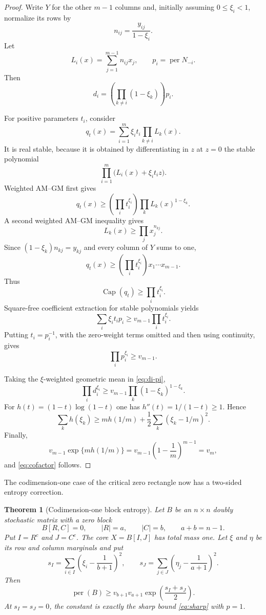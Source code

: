 \documentclass[11pt]{article}
\newtheorem{theorem}{Theorem}[section]
\theoremstyle{definition}
\newcommand{\per}{\operatorname{per}}
\newcommand{\pcap}{\operatorname{Cap}}
\begin{document}
\begin{proof}
Write $Y$ for the other $m-1$ columns and, initially assuming $0\le\xi_i<1$, normalize its rows by
\[
 n_{ij}=\frac{y_{ij}}{1-\xi_i}.
\]
Let
\[
 L_i(x)=\sum_{j=1}^{m-1}n_{ij}x_j,
 \qquad
 p_i=\per N_{-i}.
\]
Then
\[
 d_i=\left(\prod_{k\ne i}(1-\xi_k)\right)p_i.
 \tag{2.2}\label{eq:di-pi}
\]

For positive parameters $t_i$, consider
\[
 q_t(x)=\sum_{i=1}^m\xi_it_i\prod_{k\ne i}L_k(x).
 \tag{2.3}\label{eq:qt}
\]
It is real stable, because it is obtained by differentiating in $z$ at $z=0$ the stable polynomial
\[
 \prod_{i=1}^m\bigl(L_i(x)+\xi_it_i z\bigr).
\]
Weighted AM--GM first gives
\[
 q_t(x)
 \ge
 \left(\prod_i t_i^{\xi_i}\right)
 \prod_k L_k(x)^{1-\xi_k}.
\]
A second weighted AM--GM inequality gives
\[
 L_k(x)\ge\prod_jx_j^{n_{kj}}.
\]
Since $(1-\xi_k)n_{kj}=y_{kj}$ and every column of $Y$ sums to one,
\[
 q_t(x)\ge
 \left(\prod_i t_i^{\xi_i}\right)x_1\cdots x_{m-1}.
\]
Thus
\[
 \pcap(q_t)\ge\prod_i t_i^{\xi_i}.
\]
Square-free coefficient extraction for stable polynomials yields
\[
 \sum_i\xi_i t_i p_i
 \ge v_{m-1}\prod_i t_i^{\xi_i}.
 \tag{2.4}\label{eq:weighted-pi}
\]
Putting $t_i=p_i^{-1}$, with the zero-weight terms omitted and then using continuity, gives
\[
 \prod_i p_i^{\xi_i}\ge v_{m-1}.
 \tag{2.5}\label{eq:pi-gm}
\]

Taking the $\xi$-weighted geometric mean in \eqref{eq:di-pi},
\[
 \prod_i d_i^{\xi_i}
 \ge
 v_{m-1}\prod_k(1-\xi_k)^{1-\xi_k}.
 \tag{2.6}\label{eq:cofactor-intermediate}
\]
For $h(t)=(1-t)\log(1-t)$ one has $h''(t)=1/(1-t)\ge1$.  Hence
\[
 \sum_kh(\xi_k)
 \ge mh(1/m)+\frac12\sum_k(\xi_k-1/m)^2.
\]
Finally,
\[
 v_{m-1}\exp\{mh(1/m)\}=v_{m-1}\left(1-\frac1m\right)^{m-1}=v_m,
\]
and \eqref{eq:cofactor} follows.
\end{proof}

The codimension-one case of the critical zero rectangle now has a two-sided entropy correction.

\begin{theorem}[Codimension-one block entropy]\label{thm:block-entropy}
Let $B$ be an $n\times n$ doubly stochastic matrix with a zero block
\[
 B[R,C]=0,
 \qquad |R|=a,
 \qquad |C|=b,
 \qquad a+b=n-1.
\]
Put $I=R^c$ and $J=C^c$.  The core $X=B[I,J]$ has total mass one.  Let $\xi$ and $\eta$ be its row and column marginals and put
\[
 s_I=\sum_{i\in I}\left(\xi_i-\frac1{b+1}\right)^2,
 \qquad
 s_J=\sum_{j\in J}\left(\eta_j-\frac1{a+1}\right)^2.
\]
Then
\[
 \per(B)\ge
 v_{b+1}v_{a+1}\exp\!\left(\frac{s_I+s_J}{2}\right).
 \tag{2.7}\label{eq:block-entropy}
\]
At $s_I=s_J=0$, the constant is exactly the sharp bound \eqref{eq:sharp} with $p=1$.
\end{theorem}
\end{document}
